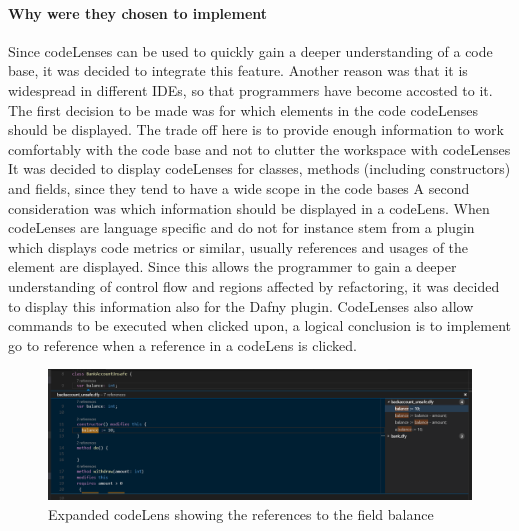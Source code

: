 \paragraph{Why were they chosen to implement}
Since codeLenses can be used to quickly gain a deeper understanding of a code base, it was decided to integrate this feature. Another reason was that it is widespread in different IDEs, so that programmers have become accosted to it. \newline
The first decision to be made was for which elements in the code codeLenses should be displayed. The trade off here is to  provide enough information to work comfortably with the code base and not to clutter the workspace with codeLenses It was decided to display codeLenses for classes, methods (including constructors) and fields, since they tend to have a wide scope in the code bases \newline
A second consideration was which information should be displayed in a codeLens. When codeLenses are language specific and do not for instance stem from a plugin which displays code metrics or similar, usually references and usages of the element are displayed. Since this allows the programmer to gain a deeper understanding of control flow and regions affected by refactoring, it was decided to display this information also for the Dafny plugin. CodeLenses also allow commands to be executed when clicked upon, a logical conclusion is to implement go to reference when a reference in a codeLens is clicked.\newline
\begin{figure}[H]
	\centering
	\includegraphics[width=1\textwidth]{img/codelensesExpanded}
	\caption{Expanded codeLens showing the references to the field balance}
	\label{fig:agcodelensesexpanded}
\end{figure}
